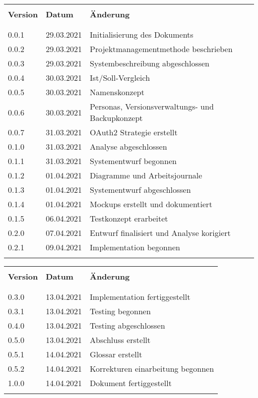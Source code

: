 \begin{table}[htp]
  \begin{tabularx}{\textwidth}{l l X}\hline \\
  \textbf{Version} & \textbf{Datum} & \textbf{Änderung} \\ \\\hline \\
  0.0.1 & 29.03.2021 & Initialisierung des Dokuments \\
  0.0.2 & 29.03.2021 & Projektmanagementmethode beschrieben \\
  0.0.3 & 29.03.2021 & Systembeschreibung abgeschlossen \\
  0.0.4 & 30.03.2021 & Ist/Soll-Vergleich \\
  0.0.5 & 30.03.2021 & Namenskonzept \\
  0.0.6 & 30.03.2021 & Personas, Versionsverwaltungs- und Backupkonzept \\
  0.0.7 & 31.03.2021 & OAuth2 Strategie erstellt \\
  0.1.0 & 31.03.2021 & Analyse abgeschlossen \\
  0.1.1 & 31.03.2021 & Systementwurf begonnen \\
  0.1.2 & 01.04.2021 & Diagramme und Arbeitsjournale \\
  0.1.3 & 01.04.2021 & Systementwurf abgeschlossen \\
  0.1.4 & 01.04.2021 & Mockups erstellt und dokumentiert \\
  0.1.5 & 06.04.2021 & Testkonzept erarbeitet \\
  0.2.0 & 07.04.2021 & Entwurf finalisiert und Analyse korigiert  \\
  0.2.1 & 09.04.2021 & Implementation begonnen  \\
  \\\hline
  \end{tabularx}
\end{table}
\pagebreak
\begin{table}[htp]
  \begin{tabularx}{\textwidth}{l l X}\hline \\
  \textbf{Version} & \textbf{Datum} & \textbf{Änderung} \\ \\\hline \\
  0.3.0 & 13.04.2021 & Implementation fertiggestellt  \\
  0.3.1 & 13.04.2021 & Testing begonnen  \\
  0.4.0 & 13.04.2021 & Testing abgeschlossen  \\
  0.5.0 & 13.04.2021 & Abschluss erstellt  \\
  0.5.1 & 14.04.2021 & Glossar erstellt  \\
  0.5.2 & 14.04.2021 & Korrekturen einarbeitung begonnen\\
  1.0.0 & 14.04.2021 & Dokument fertiggestellt \\
  \\\hline
  \end{tabularx}
\end{table}
